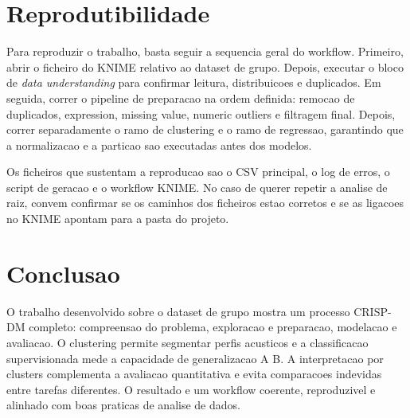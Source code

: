 \documentclass[11pt,a4paper]{article}
\begin{document}
\section{Reprodutibilidade}
Para reproduzir o trabalho, basta seguir a sequencia geral do workflow. Primeiro, abrir o ficheiro do KNIME relativo ao dataset de grupo. Depois, executar o bloco de \textit{data understanding} para confirmar leitura, distribuicoes e duplicados. Em seguida, correr o pipeline de preparacao na ordem definida: remocao de duplicados, expression, missing value, numeric outliers e filtragem final. Depois, correr separadamente o ramo de clustering e o ramo de regressao, garantindo que a normalizacao e a particao sao executadas antes dos modelos.

Os ficheiros que sustentam a reproducao sao o CSV principal, o log de erros, o script de geracao e o workflow KNIME. No caso de querer repetir a analise de raiz, convem confirmar se os caminhos dos ficheiros estao corretos e se as ligacoes no KNIME apontam para a pasta do projeto.

\section{Conclusao}
O trabalho desenvolvido sobre o dataset de grupo mostra um processo CRISP-DM completo: compreensao do problema, exploracao e preparacao, modelacao e avaliacao. O clustering permite segmentar perfis acusticos e a classificacao supervisionada mede a capacidade de generalizacao A \textrightarrow B. A interpretacao por clusters complementa a avaliacao quantitativa e evita comparacoes indevidas entre tarefas diferentes. O resultado e um workflow coerente, reproduzivel e alinhado com boas praticas de analise de dados.
\end{document}
